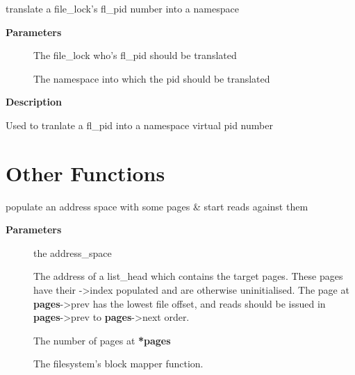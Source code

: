 \documentclass[a4paper,8pt,english]{sphinxmanual}
\begin{document}
\begin{fulllineitems}
\label{filesystems/index:c.locks_translate_pid}
translate a file\_lock's fl\_pid number into a namespace

\end{fulllineitems}


\textbf{Parameters}
\begin{description}
\item[{}] \leavevmode
The file\_lock who's fl\_pid should be translated

\item[{}] \leavevmode
The namespace into which the pid should be translated

\end{description}

\textbf{Description}

Used to tranlate a fl\_pid into a namespace virtual pid number


\section{Other Functions}
\label{filesystems/index:other-functions}

\begin{fulllineitems}
\label{filesystems/index:c.mpage_readpages}
populate an address space with some pages \& start reads against them

\end{fulllineitems}


\textbf{Parameters}
\begin{description}
\item[{}] \leavevmode
the address\_space

\item[{}] \leavevmode
The address of a list\_head which contains the target pages.  These
pages have their -\textgreater{}index populated and are otherwise uninitialised.
The page at \textbf{pages}-\textgreater{}prev has the lowest file offset, and reads should be
issued in \textbf{pages}-\textgreater{}prev to \textbf{pages}-\textgreater{}next order.

\item[{}] \leavevmode
The number of pages at \textbf{*pages}

\item[{}] \leavevmode
The filesystem's block mapper function.

\end{description}
\end{document}
